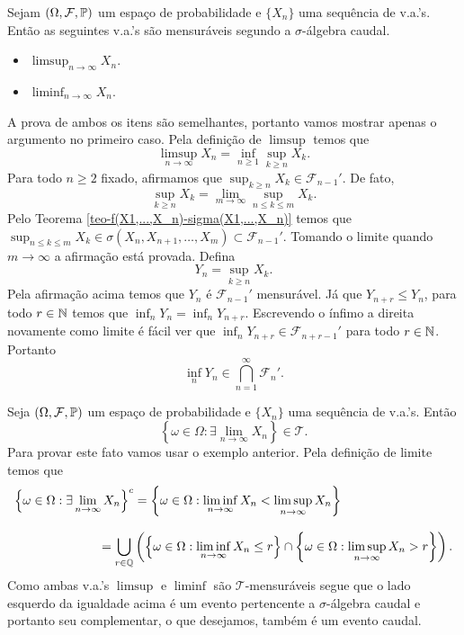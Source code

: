 \begin{exemplo}
	Sejam $(\Omega,\mathcal{F},\mathbb{P})$ um espaço de probabilidade e
	$\{X_n\}$ uma sequência de v.a.'s. Então as seguintes
	v.a.'s são mensuráveis segundo a $\sigma$-álgebra caudal. 
		\begin{itemize}
			\item 
			$\displaystyle \limsup_{n\to\infty} X_n$.
			
			\item
			$\displaystyle \liminf_{n\to\infty} X_n$.
		\end{itemize}		 

A prova de ambos os itens são semelhantes, portanto vamos 
mostrar apenas o argumento no primeiro caso.  
Pela definição de $\limsup$ temos que 
		\[
			\limsup_{n\to\infty} X_n
			=
			\inf_{n\geq 1} \sup_{k\geq n} X_k.
		\]
Para todo $n\geq 2$ fixado, 
afirmamos que $\sup_{k\geq n} X_k\in \mathcal{F}_{n-1}'$.
De fato,  
\[
	\sup_{k\geq n} X_k  
	= 
	\lim_{m\to\infty} \sup_{n\leq k\leq m} X_k.
\]
Pelo Teorema \ref{teo-f(X1,...,X_n)-sigma(X1,...,X_n)} 
temos que  
$\sup_{n\leq k\leq m} X_k
\in 
\sigma(X_n,X_{n+1},\ldots,X_{m})
\subset
\mathcal{F}_{n-1}'$.
Tomando o limite quando $m\to\infty$ a afirmação está provada. 
Defina 
	\[
		Y_{n} = \sup_{k\geq n} X_k.
	\]
Pela afirmação acima temos que $Y_n$ é $\mathcal{F}_{n-1}'$ mensurável.
Já que  $Y_{n+r}\leq Y_n$, para todo $r\in\mathbb{N}$ temos que 
$\inf_{n} Y_{n} = \inf_{n} Y_{n+r}$. Escrevendo o ínfimo 
a direita novamente como limite é fácil ver que 
$\inf_{n} Y_{n+r}\in \mathcal{F}_{n+r-1}'$ para todo 
$r\in\mathbb{N}$. Portanto 
	\[
		\inf_{n} Y_{n}\in 
		\bigcap_{n=1}^{\infty}
		\mathcal{F}_{n}'.
	\]
\end{exemplo}







\begin{exemplo}
	Seja $(\Omega,\mathcal{F},\mathbb{P})$ um espaço de probabilidade e
	$\{X_n\}$ uma sequência de v.a.'s. Então 
		\[
			\left\{
				\omega\in \Omega: 
				\exists \lim_{n\to\infty} X_n
			\right\}
			\in
			\mathcal{T}.
		\]
	Para provar este fato vamos usar o exemplo anterior.
	Pela definição de limite temos que 
	\begin{align*}
		\left\{
			\omega\in \Omega: 
			\exists \lim_{n\to\infty} X_n
		\right\}^c
		&=
		\left\{
			\omega\in \Omega: 
			\liminf_{n\to\infty} X_n 
			< 
			\limsup_{n\to\infty} X_n
		\right\}
		\\[0.3cm]
		&\hspace*{-1cm}=
		\bigcup_{r\in \Q}
		\left(		
		\left\{
			\omega\in \Omega: 
			\liminf_{n\to\infty} X_n 
			\leq r 
		\right\}
		\cap
		\left\{
			\omega\in \Omega: 
			\limsup_{n\to\infty} X_n 
			> r 
		\right\}
		\right).
	\end{align*}
Como ambas v.a.'s $\limsup$ e $\liminf$ são $\mathcal{T}$-mensuráveis
segue que o lado esquerdo da igualdade acima é um evento pertencente 
a $\sigma$-álgebra caudal e portanto seu complementar, o que desejamos,
também é um evento caudal.
\end{exemplo}





